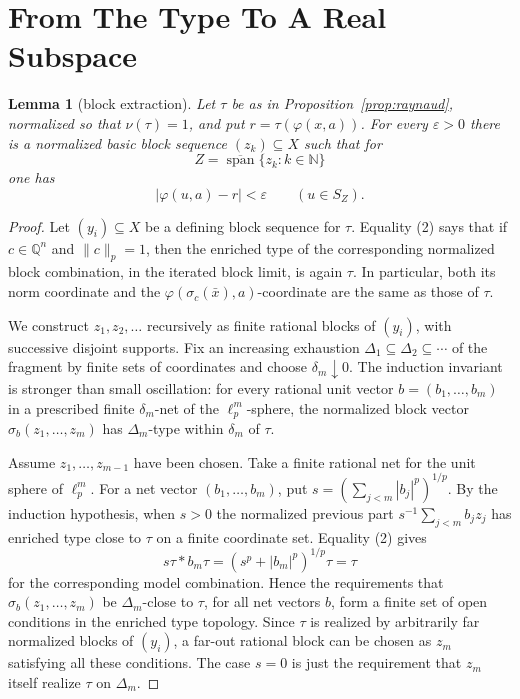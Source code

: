 \documentclass[11pt]{article}
\newtheorem{lemma}{Lemma}
\newcommand{\eps}{\varepsilon}
\newcommand{\N}{\mathbb{N}}
\newcommand{\Q}{\mathbb{Q}}
\newcommand{\Span}{\operatorname{span}}
\begin{document}
\section*{From The Type To A Real Subspace}

\begin{lemma}[block extraction]\label{lem:block-extraction}
Let \(\tau\) be as in Proposition~\ref{prop:raynaud}, normalized so that
\(\nu(\tau)=1\), and put \(r=\tau(\varphi(x,a))\). For every
\(\eps>0\) there is a normalized basic block sequence
\((z_k)\subseteq X\) such that for
\[
  Z=\overline{\Span}\{z_k:k\in\N\}
\]
one has
\[
  |\varphi(u,a)-r|<\eps
  \qquad (u\in S_Z).
\]
\end{lemma}

\begin{proof}
Let \((y_i)\subseteq X\) be a defining block sequence for \(\tau\). Equality
(2) says that if \(c\in\Q^n\) and \(\|c\|_p=1\), then the enriched type of
the corresponding normalized block combination, in the iterated block limit,
is again \(\tau\). In particular, both its norm coordinate and the
\(\varphi(\sigma_c(\bar x),a)\)-coordinate are the same as those of \(\tau\).

We construct \(z_1,z_2,\ldots\) recursively as finite rational blocks of
\((y_i)\), with successive disjoint supports. Fix an increasing exhaustion
\(\Delta_1\subseteq\Delta_2\subseteq\cdots\) of the fragment by finite sets
of coordinates and choose \(\delta_m\downarrow0\). The induction invariant is
stronger than small oscillation: for every rational unit vector
\(b=(b_1,\ldots,b_m)\) in a prescribed finite \(\delta_m\)-net of the
\(\ell_p^m\)-sphere, the normalized block vector
\(\sigma_b(z_1,\ldots,z_m)\) has \(\Delta_m\)-type within \(\delta_m\) of
\(\tau\).

Assume \(z_1,\ldots,z_{m-1}\) have been chosen. Take a finite rational net
for the unit sphere of \(\ell_p^m\). For a net vector
\((b_1,\ldots,b_m)\), put
\(s=\left(\sum_{j<m}|b_j|^p\right)^{1/p}\). By the induction hypothesis,
when \(s>0\) the normalized previous part
\(s^{-1}\sum_{j<m}b_jz_j\) has enriched type close to \(\tau\) on a finite
coordinate set. Equality (2) gives
\[
  s\tau*b_m\tau=(s^p+|b_m|^p)^{1/p}\tau=\tau
\]
for the corresponding model combination. Hence the requirements that
\(\sigma_b(z_1,\ldots,z_m)\) be \(\Delta_m\)-close to \(\tau\), for all net
vectors \(b\), form a finite set of open conditions in the enriched type
topology. Since \(\tau\) is realized by arbitrarily far normalized blocks of
\((y_i)\), a far-out rational block can be chosen as \(z_m\) satisfying all
these conditions. The case \(s=0\) is just the requirement that \(z_m\)
itself realize \(\tau\) on \(\Delta_m\).


\end{proof}
\end{document}
